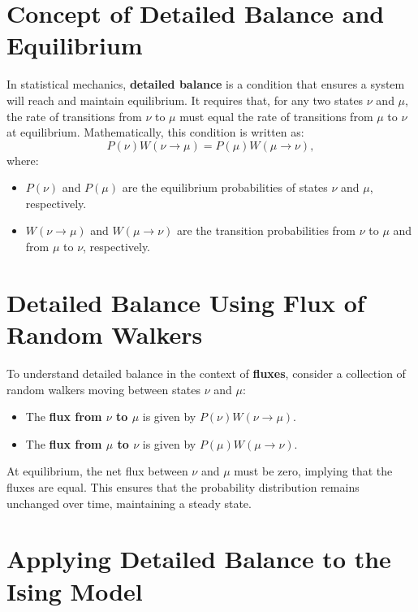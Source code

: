\documentclass[ansiapaper]{report}
\begin{document}
\begin{multicols}{3}
\section*{Concept of Detailed Balance and Equilibrium}

In statistical mechanics, \textbf{detailed balance} is a condition that ensures a system will reach and maintain equilibrium. It requires that, for any two states \( \nu \) and \( \mu \), the rate of transitions from \( \nu \) to \( \mu \) must equal the rate of transitions from \( \mu \) to \( \nu \) at equilibrium. Mathematically, this condition is written as:
\[
P(\nu) W(\nu \to \mu) = P(\mu) W(\mu \to \nu),
\]
where:
\begin{itemize}
    \item \( P(\nu) \) and \( P(\mu) \) are the equilibrium probabilities of states \( \nu \) and \( \mu \), respectively.
    \item \( W(\nu \to \mu) \) and \( W(\mu \to \nu) \) are the transition probabilities from \( \nu \) to \( \mu \) and from \( \mu \) to \( \nu \), respectively.
\end{itemize}

\section*{Detailed Balance Using Flux of Random Walkers}

To understand detailed balance in the context of \textbf{fluxes}, consider a collection of random walkers moving between states \( \nu \) and \( \mu \):
\begin{itemize}
    \item The \textbf{flux from \( \nu \) to \( \mu \)} is given by \( P(\nu) W(\nu \to \mu) \).
    \item The \textbf{flux from \( \mu \) to \( \nu \)} is given by \( P(\mu) W(\mu \to \nu) \).
\end{itemize}

At equilibrium, the net flux between \( \nu \) and \( \mu \) must be zero, implying that the fluxes are equal. This ensures that the probability distribution remains unchanged over time, maintaining a steady state.

\section*{Applying Detailed Balance to the Ising Model}


\end{multicols}
\end{document}
